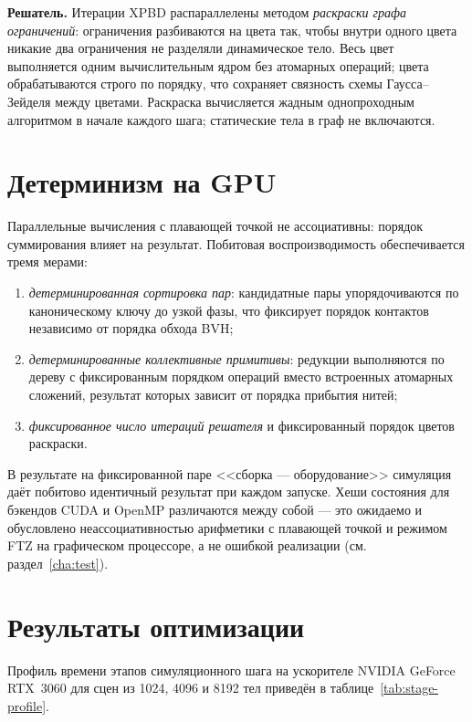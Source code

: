 \textbf{Решатель.} Итерации XPBD распараллелены методом \emph{раскраски графа
ограничений}: ограничения разбиваются на цвета так, чтобы внутри одного цвета
никакие два ограничения не разделяли динамическое тело. Весь цвет выполняется
одним вычислительным ядром без атомарных операций; цвета обрабатываются строго
по порядку, что сохраняет связность схемы Гаусса--Зейделя между цветами.
Раскраска вычисляется жадным однопроходным алгоритмом в начале каждого шага;
статические тела в граф не включаются.

\section{Детерминизм на GPU}

Параллельные вычисления с плавающей точкой не ассоциативны: порядок
суммирования влияет на результат. Побитовая воспроизводимость обеспечивается
тремя мерами:
\begin{enumerate}
  \item \emph{детерминированная сортировка пар}: кандидатные пары упорядочиваются
        по каноническому ключу до узкой фазы, что фиксирует порядок контактов
        независимо от порядка обхода BVH;
  \item \emph{детерминированные коллективные примитивы}: редукции выполняются по
        дереву с фиксированным порядком операций вместо встроенных атомарных
        сложений, результат которых зависит от порядка прибытия нитей;
  \item \emph{фиксированное число итераций решателя} и фиксированный порядок
        цветов раскраски.
\end{enumerate}
В результате на фиксированной паре <<сборка --- оборудование>> симуляция даёт
побитово идентичный результат при каждом запуске. Хеши состояния для бэкендов
CUDA и OpenMP различаются между собой --- это ожидаемо и обусловлено
неассоциативностью арифметики с плавающей точкой и режимом FTZ на графическом
процессоре, а не ошибкой реализации (см. раздел~\ref{cha:test}).

\section{Результаты оптимизации}

Профиль времени этапов симуляционного шага на ускорителе NVIDIA GeForce
RTX~3060 для сцен из 1024, 4096 и 8192 тел приведён в
таблице~\ref{tab:stage-profile}.

